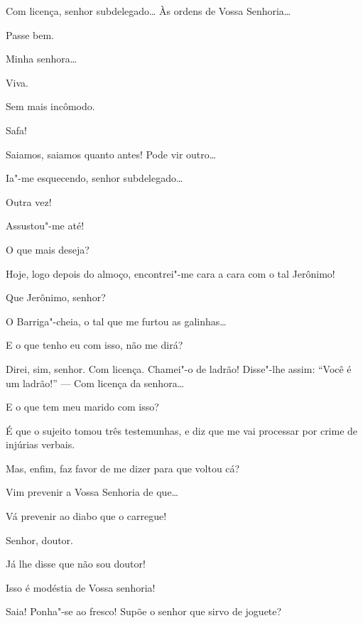 \begin{linenumbers}
 Com licença, senhor subdelegado\ldots{} Às ordens de Vossa
Senhoria\ldots{}

 Passe bem.

 Minha senhora\ldots{}

 Viva. 

 Sem mais incômodo. 

 Safa!

 Saiamos, saiamos quanto antes! Pode vir outro\ldots{} 

  Ia"-me esquecendo, senhor
subdelegado\ldots{}

 Outra vez!

 Assustou"-me até!

 O que mais deseja?

 Hoje, logo depois do almoço, encontrei"-me cara a cara com o
tal Jerônimo!

 Que Jerônimo, senhor?

 O Barriga"-cheia, o tal que me furtou as galinhas\ldots{}

 E o que tenho eu com isso, não me dirá?

 Direi, sim, senhor. Com licença.  Chamei"-o de ladrão! Disse"-lhe assim: “Você é um ladrão!” --- Com licença da senhora\ldots{}

 E o que tem meu marido com isso?

 É que o sujeito tomou três testemunhas, e diz que me vai
processar por crime de injúrias verbais.

 Mas, enfim, faz favor de me dizer para que voltou cá?

 Vim prevenir a Vossa Senhoria de que\ldots{}

 Vá prevenir ao diabo que o carregue!

  Senhor, doutor.

  Já lhe disse que não sou doutor!

  Isso é modéstia de Vossa senhoria!

 Saia! Ponha"-se ao fresco! Supõe o senhor que sirvo de joguete?


\end{linenumbers}
